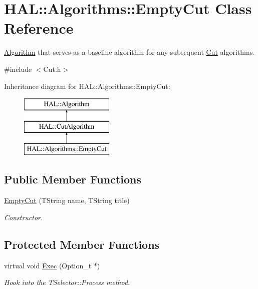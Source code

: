 \hypertarget{class_h_a_l_1_1_algorithms_1_1_empty_cut}{\section{H\+A\+L\+:\+:Algorithms\+:\+:Empty\+Cut Class Reference}
\label{class_h_a_l_1_1_algorithms_1_1_empty_cut}
}


\hyperlink{class_h_a_l_1_1_algorithm}{Algorithm} that serves as a baseline algorithm for any subsequent \hyperlink{class_h_a_l_1_1_algorithms_1_1_cut}{Cut} algorithms.  




{\ttfamily \#include $<$Cut.\+h$>$}

Inheritance diagram for H\+A\+L\+:\+:Algorithms\+:\+:Empty\+Cut\+:\begin{figure}[H]
\begin{center}
\leavevmode
\includegraphics[height=3.000000cm]{class_h_a_l_1_1_algorithms_1_1_empty_cut}
\end{center}
\end{figure}
\subsection*{Public Member Functions}
\begin{DoxyCompactItemize}
\item 
\hyperlink{class_h_a_l_1_1_algorithms_1_1_empty_cut_a07eb3faf7e5ee7f913065cb01622cd8f}{Empty\+Cut} (T\+String name, T\+String title)
\begin{DoxyCompactList}\small\item\em Constructor. \end{DoxyCompactList}\end{DoxyCompactItemize}
\subsection*{Protected Member Functions}
\begin{DoxyCompactItemize}
\item 
virtual void \hyperlink{class_h_a_l_1_1_algorithms_1_1_empty_cut_a39235392c1b3a0f8253114dbcdf0a8a6}{Exec} (Option\+\_\+t $\ast$)
\begin{DoxyCompactList}\small\item\em Hook into the T\+Selector\+::\+Process method. \end{DoxyCompactList}\end{DoxyCompactItemize}
